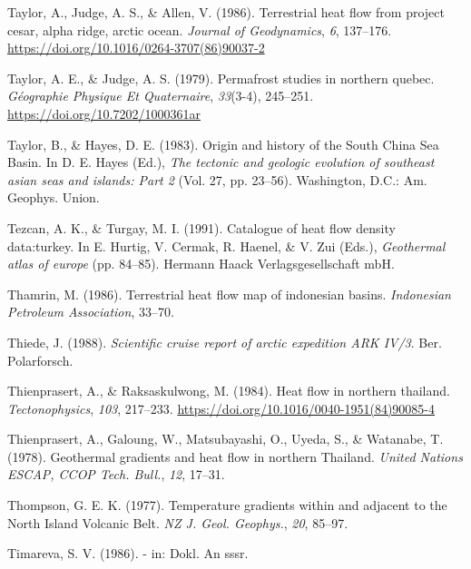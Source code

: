 \documentclass[draft,linenumbers]{agujournal2018}
\begin{document}
\leavevmode{}%
Taylor, A., Judge, A. S., \& Allen, V. (1986). Terrestrial heat flow
from project cesar, alpha ridge, arctic ocean. \emph{Journal of
Geodynamics}, \emph{6}, 137--176.
\url{https://doi.org/10.1016/0264-3707(86)90037-2}

\leavevmode{}%
Taylor, A. E., \& Judge, A. S. (1979). Permafrost studies in northern
quebec. \emph{Géographie Physique Et Quaternaire}, \emph{33}(3-4),
245--251. \url{https://doi.org/10.7202/1000361ar}

\leavevmode{}%
Taylor, B., \& Hayes, D. E. (1983). Origin and history of the {South
China Sea Basin}. In D. E. Hayes (Ed.), \emph{The tectonic and geologic
evolution of southeast asian seas and islands: Part 2} (Vol. 27, pp.
23--56). Washington, D.C.: Am. Geophys. Union.

\leavevmode{}%
Tezcan, A. K., \& Turgay, M. I. (1991). Catalogue of heat flow density
data:turkey. In E. Hurtig, V. Cermak, R. Haenel, \& V. Zui (Eds.),
\emph{Geothermal atlas of europe} (pp. 84--85). Hermann Haack
Verlagsgesellschaft mbH.

\leavevmode{}%
Thamrin, M. (1986). Terrestrial heat flow map of indonesian basins.
\emph{Indonesian Petroleum Association}, 33--70.

\leavevmode{}%
Thiede, J. (1988). \emph{Scientific cruise report of arctic expedition
ARK IV/3}. Ber. Polarforsch.

\leavevmode{}%
Thienprasert, A., \& Raksaskulwong, M. (1984). Heat flow in northern
thailand. \emph{Tectonophysics}, \emph{103}, 217--233.
\url{https://doi.org/10.1016/0040-1951(84)90085-4}

\leavevmode{}%
Thienprasert, A., Galoung, W., Matsubayashi, O., Uyeda, S., \& Watanabe,
T. (1978). Geothermal gradients and heat flow in northern {Thailand}.
\emph{United Nations ESCAP, CCOP Tech. Bull.}, \emph{12}, 17--31.

\leavevmode{}%
Thompson, G. E. K. (1977). Temperature gradients within and adjacent to
the {North Island Volcanic Belt}. \emph{NZ J. Geol. Geophys.},
\emph{20}, 85--97.

\leavevmode{}%
Timareva, S. V. (1986). - in: Dokl. An sssr.
\end{document}
